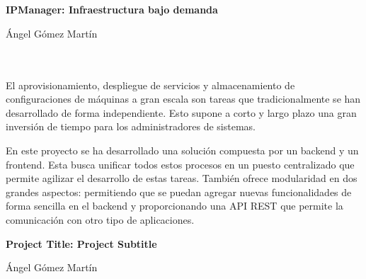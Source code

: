 

\cleardoublepage

\chapter*{}
\thispagestyle{empty}

\begin{center}
{\large\bfseries IPManager: Infraestructura bajo demanda}\\
\end{center}
\begin{center}
Ángel Gómez Martín
\end{center}

\\

\vspace{0.7cm}
\\

El aprovisionamiento, despliegue de servicios y almacenamiento de configuraciones de máquinas a gran escala son tareas que tradicionalmente se han desarrollado de forma independiente. Esto supone a corto y largo plazo una gran inversión de tiempo para los administradores de sistemas.

\bigskip
En este proyecto se ha desarrollado una solución compuesta por un backend y un frontend. Esta busca unificar todos estos procesos en un puesto centralizado que permite agilizar el desarrollo de estas tareas. También ofrece modularidad en dos grandes aspectos: permitiendo que se puedan agregar nuevas funcionalidades de forma sencilla en el backend y proporcionando una API REST que permite la comunicación con otro tipo de aplicaciones.


\cleardoublepage
\thispagestyle{empty}

\begin{center}
{\large\bfseries Project Title: Project Subtitle}\\
\end{center}
\begin{center}
Ángel Gómez Martín
\end{center}

\\

\vspace{0.7cm}
\\

